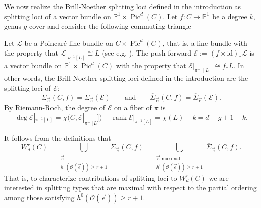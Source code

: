 \documentclass[12pt]{amsart}
\newcommand{\pp}{\mathbb{P}}
\newcommand{\E}{\mathcal{E}}
\renewcommand{\L}{\mathcal{L}}
\renewcommand{\O}{\mathscr{O}}
\DeclareMathOperator{\Pic}{Pic}
\DeclareMathOperator{\rank}{rank}
\newcommand{\Sigmabar}{\overline{\Sigma}}
\theoremstyle{definition}
\theoremstyle{remark}
\theoremstyle{remark}
\numberwithin{equation}{section}
\begin{document}
We now realize the Brill-Noether splitting loci defined in the introduction as splitting loci of a vector bundle on $\pp^1 \times \Pic^d(C)$.
Let $f\colon  C \rightarrow \pp^1$ be a degree $k$, genus $g$ cover and consider the following commuting triangle
\begin{center}
\end{center}
Let $\mathcal{L}$ be a Poincar\'e line bundle on $C \times \Pic^d(C)$, that is, a line bundle with the property that $\L|_{\nu^{-1}[L]} \cong L$ (see e.g. \cite[\S IV.2]{ACGH}).
The push forward $\E := (f \times \mathrm{id})_*\L$ is a vector bundle on $\pp^1 \times \Pic^d(C)$ with the property that $\E|_{\pi^{-1}[L]} \cong f_*L$.
In other words, the Brill-Noether splitting loci defined in the introduction are the splitting loci of $\E$:
\[\Sigma_{\vec{e}}(C, f) = \Sigma_{\vec{e}}(\E) \qquad \text{and} \qquad \Sigmabar_{\vec{e}}(C, f) = \overline{\Sigma}_{\vec{e}}(\E).\]
 By Riemann-Roch, the degree of $\E$ on a fiber of $\pi$ is
\[
\deg \E|_{\pi^{-1}[L]} = \chi(C, \E|_{\pi^{-1}[L}]) - \rank \E|_{\pi^{-1}[L]} = \chi(L) - k = d - g + 1 - k.
\]

It follows from the definitions that
\begin{equation} \label{weq}
W^r_d(C) = \bigcup_{\substack{\vec{e} \\ h^0(\O(\vec{e})) \geq r+1}} \Sigma_{\vec{e}}(C, f) = \bigcup_{\substack{\vec{e} \text{ maximal}\\ h^0(\O(\vec{e})) \geq r+1}} \overline{\Sigma}_{\vec{e}}(C, f).
\end{equation}
That is, to characterize contributions of splitting loci to $W^r_d(C)$ we are interested in splitting types that are maximal with respect to the partial ordering among those satisfying $h^0(\O(\vec{e}))\geq r+1$.
\end{document}
